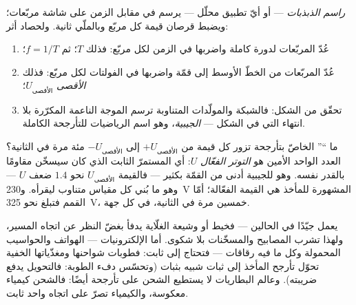 \begin{method}\label{met:g9:alternating-current:scope}
\emph{راسم الذبذبات} --- أو أيّ تطبيق
محلّل --- يرسم  في مقابل الزمن على شاشة مربّعات؛ ويضبط
قرصان قيمة كل مربّع  وبالملّي ثانية. ولحصاد أثر:
\begin{enumerate}
  \item عُدّ المربّعات لدورة كاملة واضربها في الزمن لكل مربّع:
        فذلك $T$؛ ثم $f = 1/T$؛
  \item عُدّ المربّعات من الخطّ الأوسط إلى قمّة واضربها في
        الفولتات لكل مربّع: فذلك \emph{ الأقصى}
        $U_{\text{الأقصى}}$؛
  \item تحقّق من الشكل: فالشبكة والمولّدات المتناوبة ترسم
        الموجة الناعمة المكرّرة بلا انتهاء التي في الشكل ---
        \emph{الجيبية}، وهو اسم الرياضيات للتأرجحة الكاملة.
\end{enumerate}
\end{method}

\begin{proposition}\label{prop:g9:alternating-current:effective}
ما ``'' الخاصّ بتأرجحة تزور كل قيمة من
$+U_{\text{الأقصى}}$ إلى $-U_{\text{الأقصى}}$ مئة مرة في
الثانية؟ العدد الواحد الأمين هو \emph{التوتر
الفعّال} $U$: أي  المستمرّ الثابت الذي
كان سيسخّن مقاومًا بالقدر نفسه. وهو للجيبية أدنى من القمّة
بكثير --- فالقيمة $U_{\text{الأقصى}}$ نحو $1.4$ ضعف $U$ --- وهو ما
بُني كل مقياس  متناوب ليقرأه. و\qty{230}{V} المشهورة
للمأخذ هي القيمة الفعّالة؛ أمّا القمم فتبلغ نحو \qty{325}{V}،
خمسين مرة في الثانية، في كل جهة.
\end{proposition}

\begin{example}\label{ex:g9:alternating-current:whocares}
 يعمل جيّدًا في الحالين --- فخيط  أو وشيعة
الغلّاية يدفأ بغضّ النظر عن اتجاه المسير، ولهذا تشرب المصابيح
والمسخّنات  بلا شكوى. أما الإلكترونيات ---
الهواتف والحواسيب المحمولة وكل ما فيه رقاقات --- فتحتاج إلى
 ثابت: فطوبات شواحنها ومغذّياتها الخفية تحوّل تأرجح
المأخذ إلى ثبات شبيه بثبات  (وتحسّس دفء الطوبة:
فالتحويل يدفع ضريبته). وعالم البطاريات لا يستطيع الشحن على
تأرجحة أيضًا: فالشحن كيمياء معكوسة، والكيمياء تصرّ على اتجاه
واحد ثابت.
\end{example}


